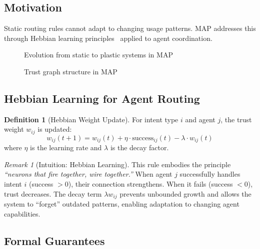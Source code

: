 \documentclass[11pt,a4paper]{article}
\theoremstyle{definition}
\newtheorem{definition}{Definition}[section]
\theoremstyle{remark}
\newtheorem{remark}{Remark}[section]
\newcommand{\map}{\textsc{MAP}\xspace}
\begin{document}
\subsection{Motivation}

Static routing rules cannot adapt to changing usage patterns. \map addresses this through Hebbian learning principles~\cite{hebb1949organization} applied to agent coordination.

\begin{figure}[H]
    \centering
    
    \caption{Evolution from static to plastic systems in \map}
    \label{fig:map-evolution}
\end{figure}

\begin{figure}[H]
    \centering
    
    \caption{Trust graph structure in \map}
    \label{fig:trust-graph}
\end{figure}

\subsection{Hebbian Learning for Agent Routing}

\begin{definition}[Hebbian Weight Update]
For intent type $i$ and agent $j$, the trust weight $w_{ij}$ is updated:
\begin{equation}
w_{ij}(t+1) = w_{ij}(t) + \eta \cdot \text{success}_{ij}(t) - \lambda \cdot w_{ij}(t)
\end{equation}
where $\eta$ is the learning rate and $\lambda$ is the decay factor.
\end{definition}

\begin{remark}[Intuition: Hebbian Learning]
This rule embodies the principle \emph{``neurons that fire together, wire together.''} When agent $j$ successfully handles intent $i$ (success $> 0$), their connection strengthens. When it fails (success $< 0$), trust decreases. The decay term $\lambda w_{ij}$ prevents unbounded growth and allows the system to ``forget'' outdated patterns, enabling adaptation to changing agent capabilities.
\end{remark}

\subsection{Formal Guarantees}
\end{document}
